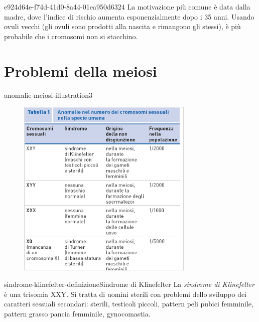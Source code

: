 \documentclass[preview]{standalone}
\begin{document}
\begin{snippet}{e924d64e-f74d-41d0-8a44-01ea950d6324}
    La motivazione più comune è data dalla madre, dove l'indice di rischio aumenta
    esponenzialmente dopo i 35 anni.
    Usando ovuli vecchi (gli ovuli sono prodotti alla nascita e rimangono gli stessi),
    è più probabile che i cromosomi non si stacchino.
\end{snippet}

\section{Problemi della meiosi}

\begin{snippet}{anomalie-meiosi-illustration3}
    \begin{center}
    \begin{figure}[ht]
        \centering
        \includegraphics[width=0.75\textwidth]{./resources/anom}
    \end{figure}
    \end{center}
\end{snippet}

\begin{snippetdefinition}{sindrome-klinefelter-definizione}{Sindrome di Klinefelter}
    La \textit{sindrome di Klinefelter}
    è una trisomia XXY. Si tratta di uomini sterili con problemi dello sviluppo
    dei caratteri sessuali secondari:
    sterili, testicoli piccoli, pattern peli pubici femminile,
    pattern grasso pancia femminile, gynocomastia.
\end{snippetdefinition}
\end{document}
